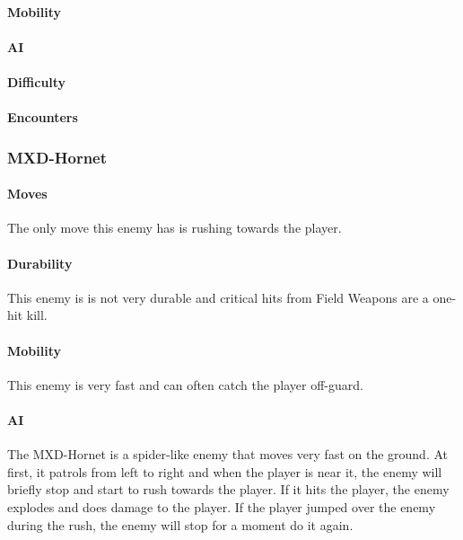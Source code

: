 \documentclass[12pt]{article}
\begin{document}
\paragraph{Mobility}

\paragraph{AI}

\paragraph{Difficulty}

\paragraph{Encounters}

\subsubsection{MXD-Hornet}

\paragraph{Moves}

The only move this enemy has is rushing towards the player.

\paragraph{Durability}

This enemy is is not very durable and critical hits from Field Weapons are a one-hit kill.

\paragraph{Mobility}

This enemy is very fast and can often catch the player off-guard. 

\paragraph{AI}

The MXD-Hornet is a spider-like enemy that moves very fast on the ground. At first, it patrols from left to right and when the player is near it, the enemy will briefly stop and start to rush towards the player. If it hits the player, the enemy explodes and does damage to the player. If the player jumped over the enemy during the rush, the enemy will stop for a moment do it again. 
\end{document}
